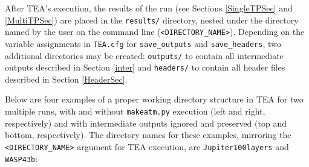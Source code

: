 {After TEA's execution, the results of the run (see Sections
\ref{SingleTPSec} and \ref{MultiTPSec}) are placed in the
\texttt{results/} directory, nested under the directory named by the
user on the command line \newline
(\texttt{<DIRECTORY\_NAME>}). Depending on the variable assignments
in \texttt{TEA.cfg} for \newline \texttt{save\_outputs} and
\texttt{save\_headers}, two additional directories may be created:
\texttt{outputs/} to contain all intermediate outputs described in
Section \ref{inter} and \texttt{headers/} to contain all header files
described in Section \ref{HeaderSec}.

Below are four examples of a proper working directory structure in TEA
for two multiple  runs, with and
without \texttt{makeatm.py} execution (left and right, respectively)
and with intermediate outputs ignored and preserved (top and bottom,
respectively). The directory names for these examples, mirroring
the \texttt{<DIRECTORY\_NAME>} argument for TEA execution,
are \newline \texttt{Jupiter100layers} and
\texttt{WASP43b}:

}
